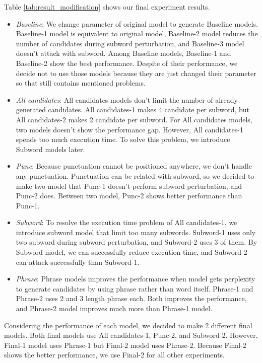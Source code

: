 \documentclass[11pt,a4paper]{article}
\begin{document}
Table \ref{tab:result_modification} shows our final experiment results.

\begin{itemize}
\item \textit{Baseline}:
We change parameter of original model to generate Baseline models.
Baseline-1 model is equivalent to original model, Baseline-2 model reduces the number of candidates during subword perturbation, and Baseline-3 model doesn't attack with subword.
Among Baseline models, Baseline-1 and Baseline-2 show the best performance. 
Despite of their performance, we decide not to use those models because they are just changed their parameter so that still contains mentioned problems.

\item \textit{All candidates}:
All candidates models don't limit the number of already generated candidates.
All candidates-1 makes 4 candidate per subword, but All candidates-2 makes 2 candidate per subword.
For All candidates models, two models doesn't show the performance gap. 
However, All candidates-1 spends too much execution time.
To solve this problem, we introduce Subword models later.

\item \textit{Punc}:
Because punctuation cannot be positioned anywhere, we don't handle any punctuation.
Punctuation can be related with subword, so we decided to make two model that Punc-1 doesn't perform subword perturbation, and Punc-2 does.
Between two model, Punc-2 shows better performance than Punc-1.

\item \textit{Subword}:
To resolve the execution time problem of All candidates-1, we introduce subword model that limit too many subwords.
Subword-1 uses only two subword during subword perturbation, and Subword-2 uses 3 of them.
By Subword model, we can successfully reduce execution time, and Subword-2 can attack successfully than Subword-1.

\item \textit{Phrase}:
Phrase models improves the performance when model gets perplexity to generate candidates by using phrase rather than word itself.
Phrase-1 and Phrase-2 uses 2 and 3 length phrase each. Both improves the performance, and Phrase-2 model improves much more than Phrase-1 model.

\end{itemize}

Considering the performance of each model, we decided to make 2 different final models. 
Both final models use All candidates-1, Punc-2, and Subword-2.
However, Final-1 model uses Phrase-1 but Final-2 model uses Phrase-2.
Because Final-2 shows the better performance, we use Final-2 for all other experiments.
\end{document}
